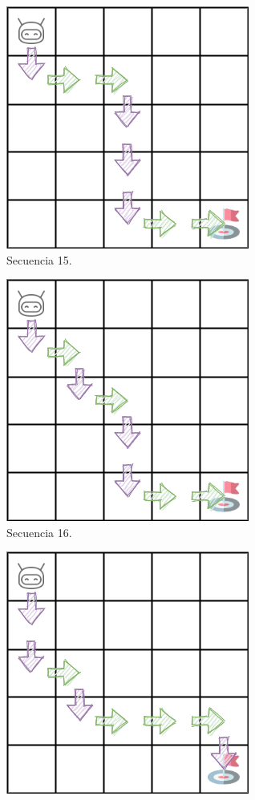 \begin{figure}
{\begin{subfigure}{.35\textwidth}
        \centering
        \includegraphics[scale=0.4]{cap5_experimentacion/images/dim5_lr0.01_ep0.7_88.png}
        \caption{Secuencia 15.}
        \label{fig:seq15}
    \end{subfigure}
    \begin{subfigure}{.35\textwidth}
        \centering
        \includegraphics[scale=0.4]{cap5_experimentacion/images/dim5_lr0.01_ep0.9_55.png}
        \caption{Secuencia 16.}
        \label{fig:seq16}
    \end{subfigure}%
    \begin{subfigure}{.35\textwidth}
        \centering
        \includegraphics[scale=0.4]{cap5_experimentacion/images/dim5_lr0.01_ep0.5_6_2.png}

\end{subfigure}}
\end{figure}
